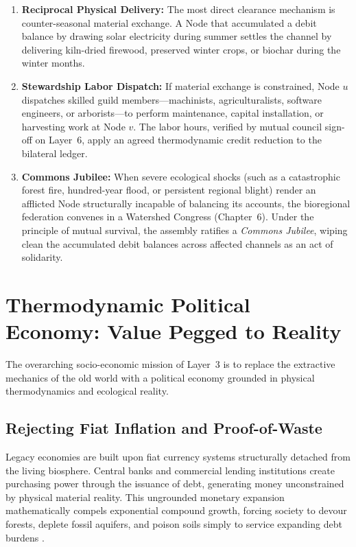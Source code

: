\begin{enumerate}
  \item \textbf{Reciprocal Physical Delivery:} The most direct clearance mechanism is counter-seasonal material exchange. A Node that accumulated a debit balance by drawing solar electricity during summer settles the channel by delivering kiln-dried firewood, preserved winter crops, or biochar during the winter months.
  \item \textbf{Stewardship Labor Dispatch:} If material exchange is constrained, Node $u$ dispatches skilled guild members---machinists, agriculturalists, software engineers, or arborists---to perform maintenance, capital installation, or harvesting work at Node $v$. The labor hours, verified by mutual council sign-off on Layer~6, apply an agreed thermodynamic credit reduction to the bilateral ledger.
  \item \textbf{Commons Jubilee:} When severe ecological shocks (such as a catastrophic forest fire, hundred-year flood, or persistent regional blight) render an afflicted Node structurally incapable of balancing its accounts, the bioregional federation convenes in a Watershed Congress (Chapter~6). Under the principle of mutual survival, the assembly ratifies a \textit{Commons Jubilee}, wiping clean the accumulated debit balances across affected channels as an act of solidarity.
\end{enumerate}

\section{Thermodynamic Political Economy: Value Pegged to Reality}
\label{sec:l3-potw}

The overarching socio-economic mission of Layer~3 is to replace the extractive mechanics of the old world with a political economy grounded in physical thermodynamics and ecological reality.

\subsection{Rejecting Fiat Inflation and Proof-of-Waste}

Legacy economies are built upon fiat currency systems structurally detached from the living biosphere. Central banks and commercial lending institutions create purchasing power through the issuance of debt, generating money unconstrained by physical material reality. This ungrounded monetary expansion mathematically compels exponential compound growth, forcing society to devour forests, deplete fossil aquifers, and poison soils simply to service expanding debt burdens \parencite{meadows2008}.

